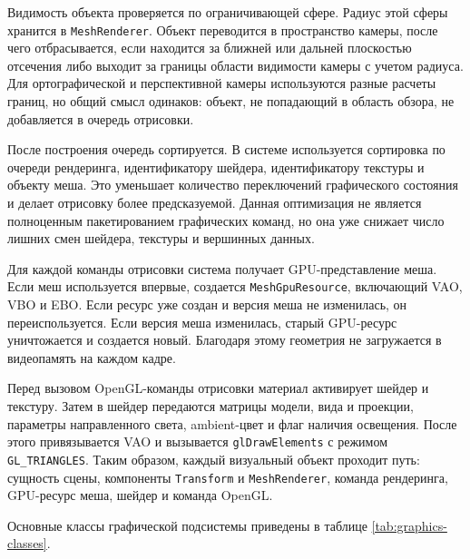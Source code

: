 Видимость объекта проверяется по ограничивающей сфере. Радиус этой сферы
хранится в \texttt{MeshRenderer}. Объект переводится в пространство камеры,
после чего отбрасывается, если находится за ближней или дальней плоскостью
отсечения либо выходит за границы области видимости камеры с учетом радиуса.
Для ортографической и перспективной камеры используются разные расчеты границ,
но общий смысл одинаков: объект, не попадающий в область обзора, не добавляется
в очередь отрисовки.

После построения очередь сортируется. В системе используется сортировка по
очереди рендеринга, идентификатору шейдера, идентификатору текстуры и объекту
меша. Это уменьшает количество переключений графического состояния и делает
отрисовку более предсказуемой. Данная оптимизация не является полноценным
пакетированием графических команд, но она уже снижает число лишних смен
шейдера, текстуры и вершинных данных.

Для каждой команды отрисовки система получает GPU-представление меша.
Если меш используется впервые, создается \texttt{MeshGpuResource}, включающий
VAO, VBO и EBO. Если ресурс уже создан и версия меша не изменилась, он
переиспользуется. Если версия меша изменилась, старый GPU-ресурс уничтожается
и создается новый. Благодаря этому геометрия не загружается в видеопамять на
каждом кадре.

Перед вызовом OpenGL-команды отрисовки материал активирует шейдер и текстуру.
Затем в шейдер передаются матрицы модели, вида и проекции, параметры
направленного света, ambient-цвет и флаг наличия освещения. После этого
привязывается VAO и вызывается \texttt{glDrawElements} с режимом
\texttt{GL\_TRIANGLES}. Таким образом, каждый визуальный объект проходит путь:
сущность сцены, компоненты \texttt{Transform} и \texttt{MeshRenderer}, команда
рендеринга, GPU-ресурс меша, шейдер и команда OpenGL.

Основные классы графической подсистемы приведены в таблице
\ref{tab:graphics-classes}.

\begingroup
\small
\setlength{\tabcolsep}{4pt}
\renewcommand{\arraystretch}{1.2}


